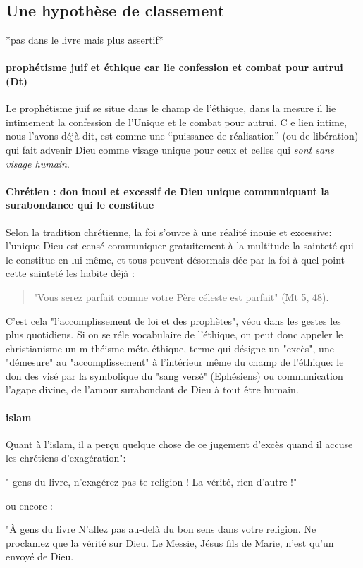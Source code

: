 \subsection{Une hypothèse de classement}
 
*pas dans le livre mais plus assertif*

\paragraph{prophétisme juif et éthique car lie confession et combat pour autrui (Dt) }
Le prophétisme juif se situe dans le champ de l'éthique, dans la mesure il lie intimement la confession de l'Unique et le combat pour autrui. C e lien intime, nous l'avons déjà dit, est comme une “puissance de réalisation” (ou de libération) qui fait advenir Dieu comme visage unique pour ceux et celles qui \textit{sont sans visage humain}.

\paragraph{Chrétien : don inoui et excessif de Dieu unique communiquant la surabondance qui le constitue}
Selon la tradition chrétienne, la foi s'ouvre à une réalité inouie et excessive: l’unique Dieu est censé communiquer gratuitement à la multitude la sainteté qui le constitue en lui-même, et tous peuvent désormais déc par la foi à quel point cette sainteté les habite déjà :  \label{Mt5Def3}
\begin{quote}
    "Vous serez parfait comme votre Père céleste est parfait" (Mt 5, 48).
\end{quote} 
C'est cela "l'accomplissement de loi et des prophètes", vécu dans les gestes les plus quotidiens. Si on se réle vocabulaire de l'éthique, on peut donc appeler le christianisme un m théisme méta-éthique, terme qui désigne un "excès", une "démesure" au "accomplissement" à l'intérieur même du champ de l'éthique: le don des visé par la symbolique du "sang versé" (Ephésiens) ou communication l'agape divine, de l'amour surabondant de Dieu à tout être humain.
\paragraph{islam}
Quant à l'islam, il a perçu quelque chose de ce jugement d'excès quand il accuse les chrétiens d'exagération": 
\begin{Ecriture}[sourate 5, 77]
    " gens du livre, n'exagérez pas te religion ! La vérité, rien d'autre !" 
\end{Ecriture}
ou encore : \begin{Ecriture}[sourate 4, 171]
  "À gens du livre N'allez pas au-delà du bon sens dans votre religion. Ne proclamez que la vérité sur Dieu. Le Messie, Jésus fils de Marie, n'est qu'un envoyé de Dieu.
\end{Ecriture}

